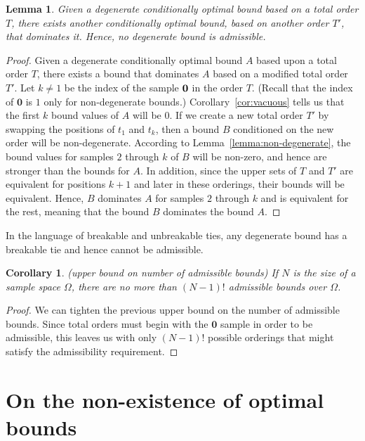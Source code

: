 \documentclass{article}
\newtheorem{lemma}[theorem]{Lemma}
\newtheorem{corollary}[theorem]{Corollary}
\theoremstyle{definition}
\theoremstyle{remark}
\begin{document}
\begin{lemma}
\label{lem:degen_are_dom}
Given a degenerate conditionally optimal bound based on a total order $T$, there exists another conditionally optimal bound, based on another order $T'$, that dominates it. Hence, no degenerate bound is admissible. 
\end{lemma}
\begin{proof}
Given a degenerate conditionally optimal bound $A$ based upon a total order $T$, there exists a bound that dominates $A$ based on a modified total order $T'$. Let $k\neq 1$ be the index of the sample $\bf{0}$ in the order $T$. (Recall that the index of $\mathbf{0}$ is $1$ only for non-degenerate bounds.) Corollary~\ref{cor:vacuous} tells us that the first $k$ bound values of $A$ will be $0$. If we create a new total order $T'$ by swapping the positions of $t_1$ and $t_k$, then a bound $B$ conditioned on the new order will be non-degenerate. According to Lemma~\ref{lemma:non-degenerate}, the bound values for samples $2$ through $k$ of $B$ will be non-zero, and hence are stronger than the bounds for $A$. In addition, since the upper sets of $T$ and $T'$ are equivalent for positions $k+1$ and later in these orderings, their bounds will be equivalent. Hence, $B$ dominates $A$ for samples $2$ through $k$ and is equivalent for the rest, meaning that the bound $B$ dominates the bound $A$.  
\end{proof}

In the language of breakable and unbreakable ties, any degenerate bound has a breakable tie and hence cannot be admissible.

\begin{corollary}(upper bound on number of admissible bounds)
\label{cor:max_admis}
If $N$ is the size of a sample space $\Omega$, there are no more than $(N-1)!$ admissible bounds over $\Omega$.
\end{corollary}
\begin{proof}
We can tighten the previous upper bound on the number of admissible bounds. Since total orders must begin with the $\mathbf{0}$ sample in order to be admissible, this leaves us with only $(N-1)!$ possible orderings that might satisfy the admissibility requirement. 
\end{proof}

\section{On the non-existence of optimal bounds}
\end{document}
